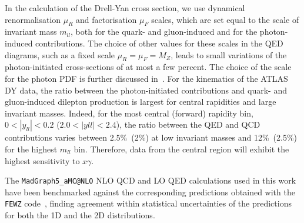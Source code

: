 In the  calculation of the Drell-Yan cross section, we use
dynamical renormalisation $\mu_{R}$ and factorisation $\mu_{F}$
scales, which are set equal to the scale of invariant mass $m_{ll}$,
both for the quark- and gluon-induced and for the photon-induced
contributions.
%
The choice of other values for these scales in the QED diagrams,
such as a fixed scale $\mu_R=\mu_F=M_Z$, leads
to  small variations of the photon-initiated cross-sections of at most a few percent.
%
The choice of the scale for the photon PDF  is further discussed
in~\cite{Dittmaier:2009cr}.
%
For the kinematics of the ATLAS DY data, the ratio between the photon-initiated
contributions and  quark- and gluon-induced dilepton production is largest
for central rapidities and large invariant masses. 
%
Indeed, for the most central (forward) rapidity
bin, $0 < |y_{ll}| < 0.2$ ($2.0 < |yll| < 2.4$), the ratio
between the QED and QCD contributions varies between 2.5\%~(2\%) at low
invariant masses and 12\%~(2.5\%) for the highest $m_{ll}$ bin.
%
Therefore, data from the central region will exhibit the highest
sensitivity to $x\gamma$.

The {\tt MadGraph5{\_}aMC@NLO} NLO QCD and LO QED calculations used in this work have been
benchmarked against the corresponding predictions  obtained with the {\tt FEWZ}
code~\cite{Gavin:2012sy}, finding agreement within statistical uncertainties of
the predictions for both the 1D and the 2D distributions.

